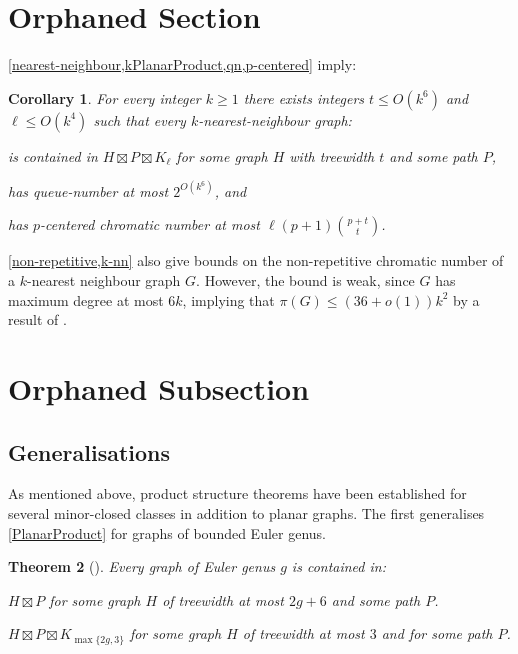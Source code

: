 \documentclass{patmorin}
\theoremstyle{plain}
\newtheorem{thm}{Theorem}
\newtheorem{cor}[thm]{Corollary}
\theoremstyle{definition}
\newcommand{\note}[2]{\noindent{\color{red}[#1:~#2]}}
\renewcommand{\geq}{\geqslant}
\renewcommand{\leq}{\leqslant}
\begin{document}


\section{Orphaned Section}

\cref{nearest-neighbour,kPlanarProduct,qn,p-centered} imply:

\begin{cor}
\label{k-nn}
For every integer $k\geq 1$ there exists integers $t\leq O(k^6)$ and $\ell\leq O(k^4)$ such that every $k$-nearest-neighbour graph:
\begin{compactitem}
\item is contained in $H\boxtimes P \boxtimes K_\ell$ for some graph $H$ with treewidth $t$ and some path $P$,
\item has queue-number at most $2^{O(k^6)}$, and
\item has $p$-centered chromatic number at most $\ell (p+1)\binom{p+t}{t}$.
\end{compactitem}
\end{cor}

\cref{non-repetitive,k-nn} also give bounds on the non-repetitive chromatic number of a $k$-nearest neighbour graph $G$. However, the bound is weak, since $G$ has maximum degree at most $6k$, implying that $\pi(G) \leq (36+o(1))k^2$ by a result of \citet{DJKW16}.




\section{Orphaned Subsection}


\subsection{Generalisations}
\label{Generalisations}

As mentioned above, product structure theorems have been established for several minor-closed classes in addition to planar graphs. The first generalises \cref{PlanarProduct} for graphs of bounded Euler genus.

\begin{thm}[\citep{DJMMUW20,UWY,DHHW}]
\label{GenusProduct}
Every graph of Euler genus $g$ is contained in:
\begin{compactenum}[(a)]
\item $H  \boxtimes P$ for some graph $H$ of treewidth at most $2g+6$  and some path $P$.
\item $H \boxtimes P \boxtimes K_{\max\{2g,3\}}$ for some graph $H$ of treewidth at most $3$ and for some path $P$.
\end{compactenum}
\end{thm}
\end{document}

